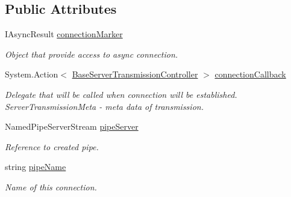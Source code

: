 \subsection*{Public Attributes}
\begin{DoxyCompactItemize}
\item 
I\+Async\+Result \mbox{\hyperlink{class_pipes_provider_1_1_server_1_1_transmission_controllers_1_1_base_server_transmission_controller_afc45a2287e6fef24892a0aee8aa86f56}{connection\+Marker}}
\begin{DoxyCompactList}\small\item\em Object that provide access to async connection. \end{DoxyCompactList}\item 
System.\+Action$<$ \mbox{\hyperlink{class_pipes_provider_1_1_server_1_1_transmission_controllers_1_1_base_server_transmission_controller}{Base\+Server\+Transmission\+Controller}} $>$ \mbox{\hyperlink{class_pipes_provider_1_1_server_1_1_transmission_controllers_1_1_base_server_transmission_controller_a632261255d8dfc87d93445180c6e2c9d}{connection\+Callback}}
\begin{DoxyCompactList}\small\item\em Delegate that will be called when connection will be established. Server\+Transmission\+Meta -\/ meta data of transmission. \end{DoxyCompactList}\item 
Named\+Pipe\+Server\+Stream \mbox{\hyperlink{class_pipes_provider_1_1_server_1_1_transmission_controllers_1_1_base_server_transmission_controller_a019f764411256a751f8a438076426a47}{pipe\+Server}}
\begin{DoxyCompactList}\small\item\em Reference to created pipe. \end{DoxyCompactList}\item 
string \mbox{\hyperlink{class_pipes_provider_1_1_server_1_1_transmission_controllers_1_1_base_server_transmission_controller_a4ce9911f1ad6814d3e5c9096d9ddde57}{pipe\+Name}}
\begin{DoxyCompactList}\small\item\em Name of this connection. \end{DoxyCompactList}\end{DoxyCompactItemize}
